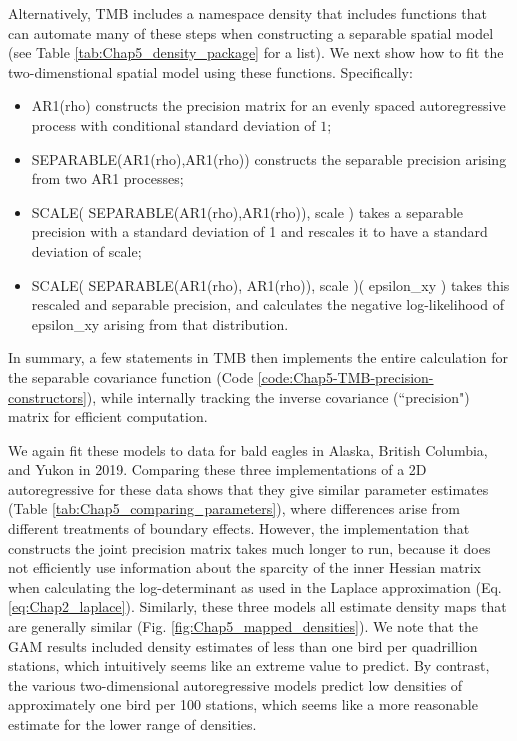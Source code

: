 Alternatively, TMB includes a namespace \colorbox{backblue}{density} that includes functions that can automate many of these steps when constructing a separable spatial model (see Table \ref{tab:Chap5_density_package} for a list).  We next show how to fit the two-dimenstional spatial model using these functions.  Specifically:
\begin{itemize}
    \item \colorbox{backblue}{AR1(rho)} constructs the precision matrix for an evenly spaced autoregressive process with conditional standard deviation of \(1\);

    \item \colorbox{backblue}{SEPARABLE(AR1(rho),AR1(rho))} constructs the separable precision arising from two AR1 processes;

    \item \colorbox{backblue}{SCALE( SEPARABLE(AR1(rho),AR1(rho)), scale )} takes a separable precision with a standard deviation of 1 and rescales it to have a standard deviation of \colorbox{backblue}{scale};

    \item \colorbox{backblue}{SCALE( SEPARABLE(AR1(rho), AR1(rho)), scale )( epsilon\_xy )} takes this rescaled and separable precision, and calculates the negative log-likelihood of \colorbox{backblue}{epsilon\_xy} arising from that distribution.
\end{itemize}
In summary, a few statements in TMB then implements the entire calculation for the separable covariance function (Code \ref{code:Chap5-TMB-precision-constructors}), while internally tracking the inverse covariance (``precision") matrix for efficient computation.  

\lstset{style=TMBcode}


We again fit these models to data for bald eagles in Alaska, British Columbia, and Yukon in 2019.  Comparing these three implementations of a 2D autoregressive for these data shows that they give similar parameter estimates (Table \ref{tab:Chap5_comparing_parameters}), where differences arise from different treatments of boundary effects.  However, the implementation that constructs the joint precision matrix takes much longer to run, because it does not efficiently use information about the sparcity of the inner Hessian matrix when calculating the log-determinant as used in the Laplace approximation (Eq. \ref{eq:Chap2_laplace}).  Similarly, these three models all estimate density maps that are generally similar (Fig. \ref{fig:Chap5_mapped_densities}).  We note that the GAM results included density estimates of less than one bird per quadrillion stations, which intuitively seems like an extreme value to predict.  By contrast, the various two-dimensional autoregressive models predict low densities of approximately one bird per 100 stations, which seems like a more reasonable estimate for the lower range of densities.   

